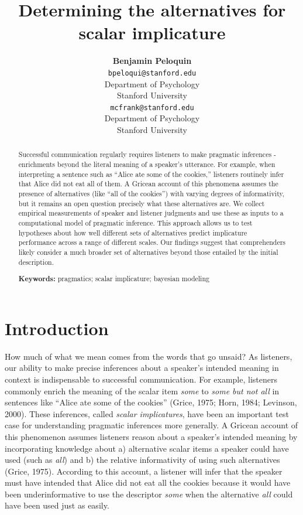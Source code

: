 \documentclass[10pt, letterpaper]{article}
\title{Determining the alternatives for scalar implicature}
\author{{\large \bf Benjamin Peloquin} \\ \texttt{bpeloqui@stanford.edu} \\ Department of Psychology \\ Stanford University \And {\large \bf Michael C. Frank} \\ \texttt{mcfrank@stanford.edu} \\ Department of Psychology \\ Stanford University}
\begin{document}
\maketitle

\begin{abstract}
Successful communication regularly requires listeners to make pragmatic
inferences - enrichments beyond the literal meaning of a speaker's
utterance. For example, when interpreting a sentence such as ``Alice ate
some of the cookies,'' listeners routinely infer that Alice did not eat
all of them. A Gricean account of this phenomena assumes the presence of
alternatives (like ``all of the cookies'') with varying degrees of
informativity, but it remains an open question precisely what these
alternatives are. We collect empirical measurements of speaker and
listener judgments and use these as inputs to a computational model of
pragmatic inference. This approach allows us to test hypotheses about
how well different sets of alternatives predict implicature performance
across a range of different scales. Our findings suggest that
comprehenders likely consider a much broader set of alternatives beyond
those entailed by the initial description.

\textbf{Keywords:}
pragmatics; scalar implicature; bayesian modeling
\end{abstract}

\section{Introduction}\label{introduction}

How much of what we mean comes from the words that go unsaid? As
listeners, our ability to make precise inferences about a speaker's
intended meaning in context is indispensable to successful
communication. For example, listeners commonly enrich the meaning of the
scalar item \emph{some} to \emph{some but not all} in sentences like
``Alice ate some of the cookies'' (Grice, 1975; Horn, 1984; Levinson,
2000). These inferences, called \emph{scalar implicatures}, have been an
important test case for understanding pragmatic inferences more
generally. A Gricean account of this phenomenon assumes listeners reason
about a speaker's intended meaning by incorporating knowledge about a)
alternative scalar items a speaker could have used (such as \emph{all})
and b) the relative informativity of using such alternatives (Grice,
1975). According to this account, a listener will infer that the speaker
must have intended that Alice did not eat all the cookies because it
would have been underinformative to use the descriptor \emph{some} when
the alternative \emph{all} could have been used just as easily.
\end{document}
